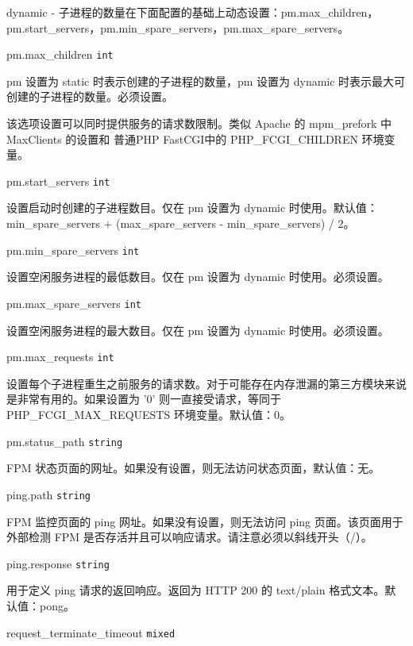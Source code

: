 \begin{compactitem}
\begin{compactenum}
\item dynamic - 子进程的数量在下面配置的基础上动态设置：pm.max\_children，pm.start\_servers，pm.min\_spare\_servers，pm.max\_spare_servers。
\end{compactenum}


\item pm.max\_children \texttt{int}

pm 设置为 static 时表示创建的子进程的数量，pm 设置为 dynamic 时表示最大可创建的子进程的数量。必须设置。

该选项设置可以同时提供服务的请求数限制。类似 Apache 的 mpm_prefork 中 MaxClients 的设置和 普通PHP FastCGI中的 PHP_FCGI_CHILDREN 环境变量。

\item pm.start\_servers \texttt{int}

设置启动时创建的子进程数目。仅在 pm 设置为 dynamic 时使用。默认值：min\_spare\_servers + (max\_spare\_servers - min\_spare\_servers) / 2。

\item pm.min\_spare\_servers \texttt{int}

设置空闲服务进程的最低数目。仅在 pm 设置为 dynamic 时使用。必须设置。

\item pm.max\_spare\_servers \texttt{int}

设置空闲服务进程的最大数目。仅在 pm 设置为 dynamic 时使用。必须设置。

\item pm.max\_requests \texttt{int}

设置每个子进程重生之前服务的请求数。对于可能存在内存泄漏的第三方模块来说是非常有用的。如果设置为 '0' 则一直接受请求，等同于 PHP\_FCGI\_MAX\_REQUESTS 环境变量。默认值：0。

\item pm.status\_path \texttt{string}

FPM 状态页面的网址。如果没有设置，则无法访问状态页面，默认值：无。

\ietm ping.path \texttt{string}

FPM 监控页面的 ping 网址。如果没有设置，则无法访问 ping 页面。该页面用于外部检测 FPM 是否存活并且可以响应请求。请注意必须以斜线开头（/）。

\item ping.response \texttt{string}

用于定义 ping 请求的返回响应。返回为 HTTP 200 的 text/plain 格式文本。默认值：pong。

\item request\_terminate\_timeout \texttt{mixed}


\end{compactitem}
